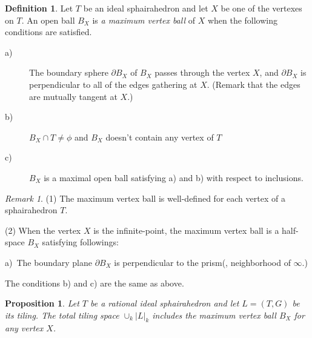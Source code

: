 \documentclass[suppldata, dvipdfmx]{interact}
\theoremstyle{plain}%
\newtheorem{proposition}[theorem]{Proposition}
\theoremstyle{definition}
\newtheorem{definition}[theorem]{Definition}
\theoremstyle{remark}
\newtheorem{remark}{Remark}
\theoremstyle{problemstyle}
\begin{document}
\begin{definition}
 Let $T$ be an ideal sphairahedron and let $X$ be one of the vertexes on $T$.
 An open ball $B_X$ is \textit{a maximum vertex ball} of $X$ when the following conditions are satisfied.
 \begin{description}
  \item[a)] The boundary sphere $\partial B_X$ of $B_X$ passes through
             the vertex $X$, and $\partial B_X$ is perpendicular to all of the
             edges gathering at $X$. (Remark that the edges are mutually tangent at $X$.)
  \item[b)] $B_X \cap T \neq \phi$ and $B_X$ doesn't contain any vertex of
             $T$
  \item[c)] $B_X$ is a maximal open ball satisfying a) and b) with respect to inclusions.
 \end{description}
\end{definition}

\begin{remark}
(1) The maximum vertex ball is well-defined for each vertex of a sphairahedron $T$.\par
(2) When the vertex $X$ is the infinite-point,
the maximum vertex ball is a half-space $B_X$ satisfying followings:\par
a)\ The boundary plane $\partial B_X$ is perpendicular to the prism(, neighborhood of $\infty$.)\par
The conditions b) and c) are the same as above.\par
\end{remark}

\begin{proposition}\label{prop:limitBall}
Let $T$ be a rational ideal sphairahedron and let $L=(T,G)$ be its tiling.  
The total tiling space $\cup_k |L|_k$ includes the maximum vertex ball $B_X$ for any vertex $X$.
\end{proposition}
\end{document}
